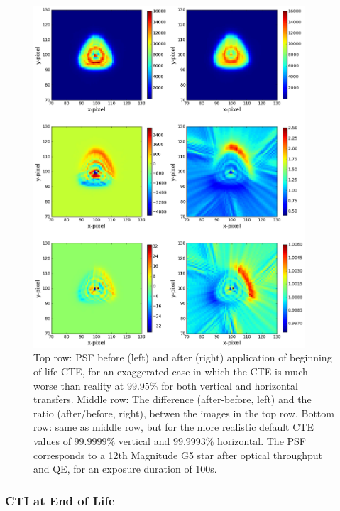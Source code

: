 \documentclass[11pt]{article}      %
\def\HCode#1{}
\def\htmlanchor#1{\HCode{<a id="#1"></a>}}
\begin{document}
\begin{figure}[htbp]
  \begin{center}
    \includegraphics[width=0.9\textwidth]{cte_bol_psf.png}
    \caption{Top row: PSF before (left) and after (right) application of beginning of life CTE, for an exaggerated case in which the CTE is much worse than reality at 99.95\% for both vertical and horizontal transfers. Middle row: The difference (after-before, left) and the ratio (after/before, right), betwen the images in the top row. Bottom row: same as middle row, but for the more realistic default CTE values of 99.9999\% vertical and 99.9993\% horizontal. The PSF corresponds to a 12th Magnitude G5 star after optical throughput and QE, for an exposure duration of 100s.}
    \label{fig:cte_bol_psf}
  \end{center}
\end{figure}

\clearpage
\htmlanchor{endOfLife}
\subsubsection{CTI at End of Life}
\label{sec:cti_eol}
\end{document}
